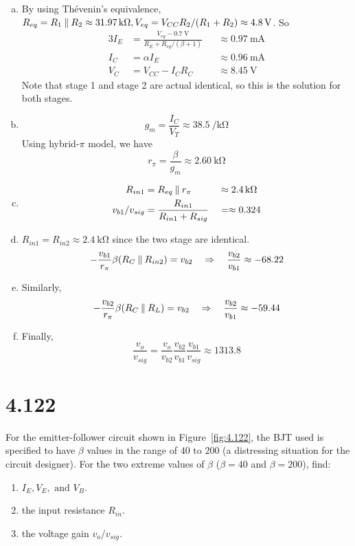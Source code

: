 \documentclass[12pt, a4paper]{article}
\begin{document}
\Ans
\begin{enumerate}[(a)]
  \item 
    By using Thévenin's equivalence, $R_{eq} = R_1 \paral R_2 \approx \SI{31.97}\kohm, V_{eq} = V_{CC} R_2 / (R_1 + R_2) \approx \SI{4.8}\V$. So
    \begin{alignat*}{3}
      I_E &= \frac{V_{eq} - \SI{0.7}\V}{R_E + R_{eq} / (\beta + 1)} 
      && \approx \SI{0.97}\mA \\
      I_C &= \alpha I_E  && \approx \SI{0.96}\mA \\
      V_C &= V_{CC} - I_C R_C && \approx \SI{8.45}\V
    \end{alignat*}
    Note that stage 1 and stage 2 are actual identical, so this is the solution for both stages.
  \item 
    \[ g_m = \frac{I_C}{V_T} \approx \SI{38.5}{\per\kohm} \]
    Using hybrid-$\pi$ model, we have
    \[ r_\pi = \frac{\beta}{g_m} \approx \SI{2.60}\kohm \]
  \item 
    \begin{alignat*}{3}
      R_{in1} &= R_{eq} \paral r_\pi && \approx  \SI{2.4}\kohm \\
      v_{b1} / v_{sig} &= \frac{R_{in1}}{R_{in1} + R_{sig}} &&= \approx 0.324
    \end{alignat*}
  \item 
    $R_{in1} = R_{in2} \approx \SI{2.4}\kohm$ since the two stage are identical.
    \[ - \frac{v_{b1}}{r_\pi} \beta (R_C \mathbin{\|} R_{in2}) = v_{b2} \quad \Rightarrow \quad
    \frac{v_{b2}}{v_{b1}} \approx -68.22 \]
  \item 
    Similarly, 
    \[ - \frac{v_{b2}}{r_\pi} \beta (R_C \mathbin{\|} R_L) = v_{b2} \quad \Rightarrow \quad
    \frac{v_{b2}}{v_{b1}} \approx -59.44 \]
  \item
    Finally,
    \[ \frac{v_o}{v_{sig}} = \frac{v_o}{v_{b2}} \frac{v_{b2}}{v_{b1}} 
    \frac{v_{b1}}{v_{sig}} \approx 1313.8 \]
    
\end{enumerate}

\section{4.122}
For the emitter-follower circuit shown in Figure~\ref{fig:4.122}, the BJT used  is specified to have $\beta$ values in the range of $40 \text{ to } 200$ (a distressing situation for the circuit designer). For the two extreme values of $\beta$ ($\beta = 40$ and $\beta = 200$), find:

\begin{enumerate}
  \item $I_E, V_E, \text{ and } V_B$.
  \item the input resistance $R_{in}$.
  \item the voltage gain $v_o/v_{sig}$.
\end{enumerate}
\end{document}
